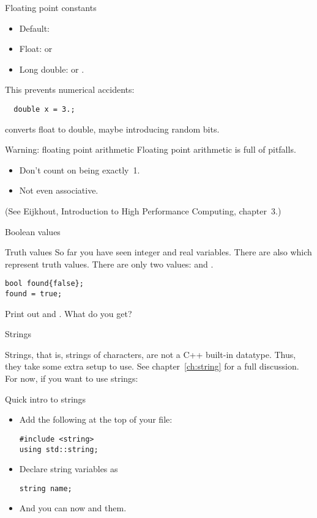 \begin{block}{Floating point constants}
  \label{sl:float-vars}
  \begin{itemize}
  \item Default: 
  \item Float:  or 
  \item Long double:  or .
  \end{itemize}
  This prevents numerical accidents: 
\begin{verbatim}
  double x = 3.;
\end{verbatim}
  converts float to double, maybe introducing random bits.
\end{block}

\begin{block}{Warning: floating point arithmetic}
  \label{sl:float-arith}
  Floating point arithmetic is full of pitfalls.
  \begin{itemize}
  \item Don't count on  being exactly~1.
  \item Not even associative.
  \end{itemize}
  (See Eijkhout, Introduction to High Performance Computing, chapter~3.)
\end{block}

 {Boolean values}

\begin{block}{Truth values}
  \label{sl:bool-var}
  So far you have seen integer and real variables. There are also
   which represent truth values. There are
  only two values:  and .
\begin{verbatim}
bool found{false};
found = true;
\end{verbatim}
\end{block}

\begin{exercise}
  \label{ex:print-truefalse}
  Print out  and . What do you get?
\end{exercise}

 {Strings}

Strings, that is, strings of characters, are not a C++ built-in
datatype. Thus, they take some extra setup to use.
See chapter~\ref{ch:string} for a full discussion.
For now, if you
want to use strings:

\begin{block}{Quick intro to strings}
  \label{sl:quick-string}
  \begin{itemize}
  \item Add the following at the top of your file:
\begin{verbatim}
#include <string>
using std::string;
\end{verbatim}
\item Declare string variables as
\begin{verbatim}
string name;
\end{verbatim}
\item And you can now  and  them.
  \end{itemize}
\end{block}


